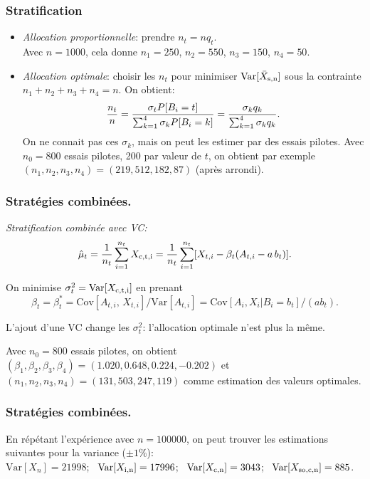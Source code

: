 \documentclass[t,usepdftitle=false]{beamer}
\def\Var{\mbox{Var}}
\def\Cov{\mbox{Cov}}
\begin{document}
\begin{frame}
\frametitle{Stratification}

\begin{itemize}
\item
\emph{Allocation proportionnelle}: prendre ${n_t} = n q_t$.\\
 Avec $n=1000$, cela donne $n_1 = 250$, $n_2 = 550$, $n_3 = 150$, $n_4
 = 50$.
\item
\emph{Allocation optimale}: 
 choisir les $n_t$ pour minimiser $\Var[\bar X_{\rm{s},n}]$ sous la contrainte
 $n_1+n_2+n_3+n_4=n$.  On obtient:
\[
  \frac{{n_t}}{n} 
  = {\sigma_t P[B_i=t] \over\sum_{k=1}^4 \sigma_k P[B_i=k]}
  = {\sigma_k q_k \over\sum_{k=1}^4 \sigma_k q_k}.
\]
On ne connait pas ces $\sigma_k$, mais on peut les estimer par des 
essais pilotes.
Avec ${n_0=800}$ essais pilotes, 200 par valeur de $t$, on obtient par
exemple $(n_1, n_2, n_3, n_4) = (219, 512, 182, 87)$ (après arrondi). 
\end{itemize}

\end{frame}

\begin{frame}
\frametitle{Stratégies combinées.}

\emph{Stratification combinée avec VC:}\\
$$ 
  {\hat\mu_t} = {1\over n_t} \sum_{i=1}^{n_t} X_{\rm{c},t,i} 
        = {1\over n_t} \sum_{i=1}^{n_t} 
      [X_{t,i} - \beta_t (A_{t,i} - a\,b_t)].
$$

\mbox{}

On minimise ${\sigma_t^2} = \Var[X_{\rm{c},t,i}]$ en prenant 
\[
  \beta_t = {\beta_t^*} = \Cov[A_{t,i},\, X_{t,i}] / \Var[A_{t,i}]
   = \Cov[A_i, X_i | B_i=b_t] / (a b_t).
\]

\mbox{}

L'ajout d'une VC change les $\sigma_t^2$: l'allocation 
optimale n'est plus la m\^eme.

\mbox{}

Avec $n_0=800$ essais pilotes, on obtient
$(\beta_1,\beta_2, \beta_3, \beta_4) = (1.020, 0.648, 0.224, -0.202)$ 
et $(n_1, n_2, n_3, n_4) = (131, 503, 247, 119)$ 
comme estimation des valeurs optimales.

\end{frame}

\begin{frame}
\frametitle{Stratégies combinées.}

En répétant l'expérience avec ${n = 100000}$, on peut trouver les
estimations suivantes pour la variance ($\pm 1\%$):\\
$\Var[X_{n}] = 21998$; \
$\Var[X_{\rm{i},n}] = 17996$; \
$\Var[X_{\rm{c},n}] = 3043$; \
$\Var[X_{\rm{s}o,\rm{c},n}] = 885$.

\end{frame}
\end{document}
